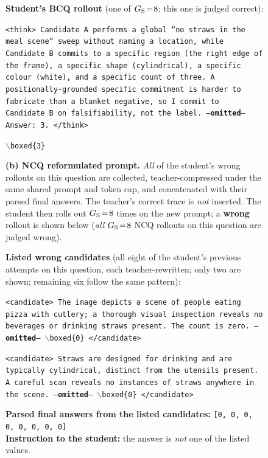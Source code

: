 \documentclass{llmxive}
\begin{document}
\begin{figure}[!p]
\begin{prompttemplatefig}
\textbf{Student's BCQ rollout} (one of $G_{\rm S}\!=\!8$; this one is judged correct):

\smallskip
\texttt{<think> Candidate~A performs a global ``no straws in the meal scene'' sweep without naming a location, while Candidate~B commits to a specific region (the right edge of the frame), a specific shape (cylindrical), a specific colour (white), and a specific count of three. A positionally-grounded specific commitment is harder to fabricate than a blanket negative, so I commit to Candidate~B on falsifiability, not the label. ---\textbf{omitted}--- Answer: 3. </think>}

\smallskip
\texttt{$\backslash$boxed\{3\}} \quad \checkmark
\end{prompttemplatefig}

\vspace{1pt}\noindent\textbf{(b) NCQ reformulated prompt.} \emph{All} of the student's wrong rollouts on this question are collected, teacher-compressed under the same shared prompt and token cap, and concatenated with their parsed final answers. The teacher's correct trace is \emph{not} inserted. The student then rolls out $G_{\rm S}\!=\!8$ times on the new prompt; a \textbf{wrong} rollout is shown below (\emph{all} $G_{\rm S}\!=\!8$ NCQ rollouts on this question are judged wrong).

\begin{negcandidatebox}
\textbf{Listed wrong candidates} (all eight of the student's previous attempts on this question, each teacher-rewritten; only two are shown; remaining six follow the same pattern):

\smallskip
\texttt{<candidate> The image depicts a scene of people eating pizza with cutlery; a thorough visual inspection reveals no beverages or drinking straws present. The count is zero. ---\textbf{omitted}--- $\backslash$boxed\{0\} </candidate>}

\smallskip
\texttt{<candidate> Straws are designed for drinking and are typically cylindrical, distinct from the utensils present. A careful scan reveals no instances of straws anywhere in the scene. ---\textbf{omitted}--- $\backslash$boxed\{0\} </candidate>}

\smallskip
\textbf{Parsed final answers from the listed candidates:} \texttt{[0, 0, 0, 0, 0, 0, 0, 0]} \\
\textbf{Instruction to the student:} the answer is \emph{not} one of the listed values.
\end{negcandidatebox}


\end{figure}
\end{document}
